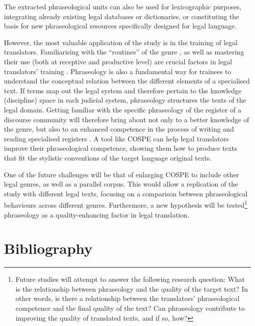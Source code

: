\documentclass[output=paper]{LSP/langsci}
\begin{document}
The extracted phraseological units can also be used for lexicographic purposes, integrating already existing legal databases or dictionaries, or constituting the basis for new phraseological resources specifically designed for legal language.

However, the most valuable application of the study is in the training of legal translators. Familiarising with the “routines” of the genre \citep{Hatim1997}, as well as mastering their use (both at receptive and productive level) are crucial factors in legal translators’ training \citep[see][]{Garzone2007}. Phraseology is also a fundamental way for trainees to understand the conceptual relation between the different elements of a specialised text. If terms map out the legal system and therefore pertain to the knowledge (discipline) space in each judicial system, phraseology structures the texts of the legal domain. Getting familiar with the specific phraseology of the register of a discourse community will therefore bring about not only to a better knowledge of the genre, but also to an enhanced competence in the process of writing and reading specialised registers \citep[see][]{Williams2002}. A tool like COSPE can help legal translators improve their phraseological competence, showing them how to produce texts that fit the stylistic conventions of the target language original texts.

One of the future challenges will be that of enlarging COSPE to include other legal genres, as well as a parallel corpus. This would allow a replication of the study with different legal texts, focusing on a comparison between phraseological behaviours across different genres. Furthermore, a new hypothesis will be tested\footnote{Future studies will attempt to answer the following research question: What is the relationship between phraseology and the quality of the target text? In other words, is there a relationship between the translators’ phraseological competence and the final quality of the text? Can phraseology contribute to improving the quality of translated texts, and if so, how?} phraseology as a quality-enhancing factor in legal translation.



\section{Bibliography}


\printbibliography[heading=subbibliography,notkeyword=this]
\end{document}
